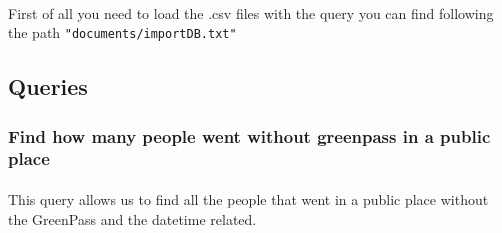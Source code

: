 \documentclass[a4paper,12pt]{article}
\begin{document}
\paragraph{} First of all you need to load the .csv files with the query you can find following the path \texttt{"documents/importDB.txt"}
\subsection{Queries}
\subsubsection{Find how many people went without greenpass in a public place}
\paragraph{} This query allows us to find all the people that went in a public place without the GreenPass and the datetime related.
\begin{center}
\end{center}
\end{document}

